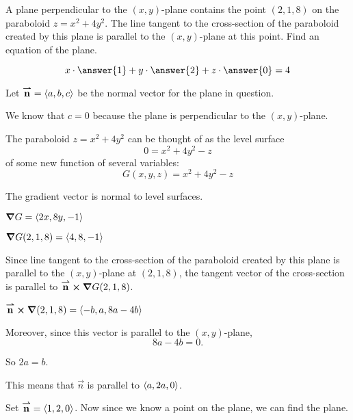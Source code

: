 \documentclass{ximera}
\author{David Guichard \and Neal Koblitz \and H. Jerome Keisler \and Albert Scheller \and Barry Balof \and Mike Wills \and Matthew Carr \and Bart Snapp}
\begin{document}
\begin{exercise}
A plane perpendicular to the $(x,y)$-plane contains the point
$(2,1,8)$ on the paraboloid $z=x^2+4y^2$. The line tangent to the
cross-section of the paraboloid created by this plane is parallel to
the $(x,y)$-plane at this point.  Find an equation of the plane.

\begin{prompt}
\[
x\cdot \answer{1} + y \cdot \answer{2} + z \cdot \answer{0} = 4
\]
\end{prompt}

\begin{hint}
  Let ${\overset{\boldsymbol{\rightharpoonup}}{\mathbf{n}}}=\left\langle a,b,c\right\rangle$ be the normal vector for the plane in
  question.
\end{hint}

\begin{hint}
  We know that $c=0$ because the plane is perpendicular to the
  $(x,y)$-plane.
\end{hint}

\begin{hint}
  The paraboloid $z=x^2+4y^2$ can be thought of as the level surface
  \[
  0 = x^2+4y^2-z
  \]
  of some new function of several variables:
  \[
  G(x,y,z) = x^2+4y^2-z
  \]
\end{hint}

\begin{hint}
  The gradient vector is normal to level surfaces.
\end{hint}


\begin{hint}
  $\boldsymbol\nabla G = \left\langle 2x,8y,-1\right\rangle$
\end{hint}

\begin{hint}
  $\boldsymbol\nabla G(2,1,8) = \left\langle 4,8,-1\right\rangle$
\end{hint}

\begin{hint}
  Since line tangent to the cross-section of the paraboloid created by
  this plane is parallel to the $(x,y)$-plane at $(2,1,8)$, the
  tangent vector of the cross-section is parallel to
  ${\overset{\boldsymbol{\rightharpoonup}}{\mathbf{n}}}\boldsymbol\times\boldsymbol\nabla G(2,1,8)$.
\end{hint}

\begin{hint}
  ${\overset{\boldsymbol{\rightharpoonup}}{\mathbf{n}}}\boldsymbol\times\boldsymbol\nabla(2,1,8) = \left\langle -b,a,8a-4b\right\rangle$
\end{hint}

\begin{hint}
  Moreover, since this vector is parallel to the $(x,y)$-plane,
  \[
  8a-4b = 0.
  \]
\end{hint}

\begin{hint}
  So $2a=b$.
\end{hint}

\begin{hint}
  This means that $\vec{n}$ is parallel to $\left\langle a,2a,0\right\rangle$.
\end{hint}

\begin{hint}
  Set ${\overset{\boldsymbol{\rightharpoonup}}{\mathbf{n}}}= \left\langle 1,2,0\right\rangle$. Now since we know a point on the
  plane, we can find the plane.
\end{hint}


\end{exercise}
\end{document}
